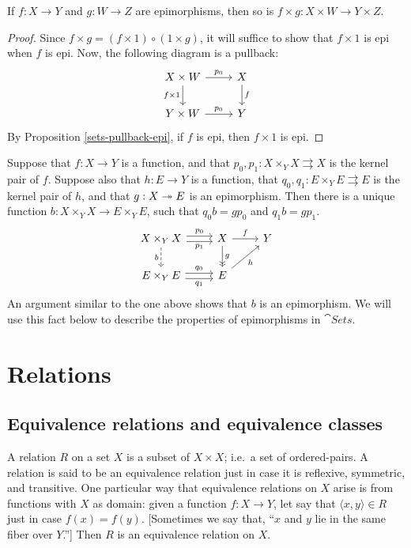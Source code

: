 \begin{prop} If $f:X\to Y$ and $g:W\to Z$ are epimorphisms, then so is
  $f\times g:X\times W\to Y\times Z$. \end{prop}

\begin{proof} Since $f\times g=(f\times 1)\circ (1\times g)$, it will
  suffice to show that $f\times 1$ is epi when $f$ is epi.  Now, the
  following diagram is a pullback:
\[ \begin{tikzcd}
  X\times W \arrow{r}{p_0} \arrow[d,"f\times 1"'] & X \arrow{d}{f} \\
  Y\times W \arrow{r}{p_0} & Y \end{tikzcd} \] By Proposition
\ref{sets-pullback-epi}, if $f$ is epi, then $f\times 1$ is
epi.  \end{proof}


Suppose that $f:X\to Y$ is a function, and that $p_0,p_1:X\times
_YX\rightrightarrows X$ is the kernel pair of $f$.  Suppose also that
$h:E\to Y$ is a function, that $q_0,q_1:E\times _YE\rightrightarrows
E$ is the kernel pair of $h$, and that $g:X\twoheadrightarrow E$ is an epimorphism.
Then there is a unique function $b:X\times _YX\to E\times _YE$, such
that $q_0b=gp_0$ and $q_1b=gp_1$.
\[ \begin{tikzcd} X\times _Y X \arrow[d,dashed,"b"'] \arrow[r,shift
  left,"p_0"] \arrow[shift
  right,r,"p_1"'] & X \arrow[d,->>,"g"] \arrow[r,"f"] & Y \\
  E\times _Y E \arrow[shift left,r,"q_0"] \arrow[shift right,r,"q_1"']
  & E \arrow[ur,"h"'] \end{tikzcd} \] An argument similar to the one
above shows that $b$ is an epimorphism.  We will use this fact below
to describe the properties of epimorphisms in $\cat{Sets}$.


\section{Relations}

\subsection*{Equivalence relations and equivalence classes}




A relation $R$ on a set $X$ is a subset of $X\times X$; i.e.\ a set of
ordered-pairs.  A relation is said to be an equivalence relation just
in case it is reflexive, symmetric, and transitive.  One particular
way that equivalence relations on $X$ arise is from functions with $X$
as domain: given a function $f:X\to Y$, let say that $\langle
x,y\rangle \in R$ just in case $f(x)=f(y)$.  [Sometimes we say that,
``$x$ and $y$ lie in the same fiber over $Y$.'']  Then $R$ is an
equivalence relation on $X$.

